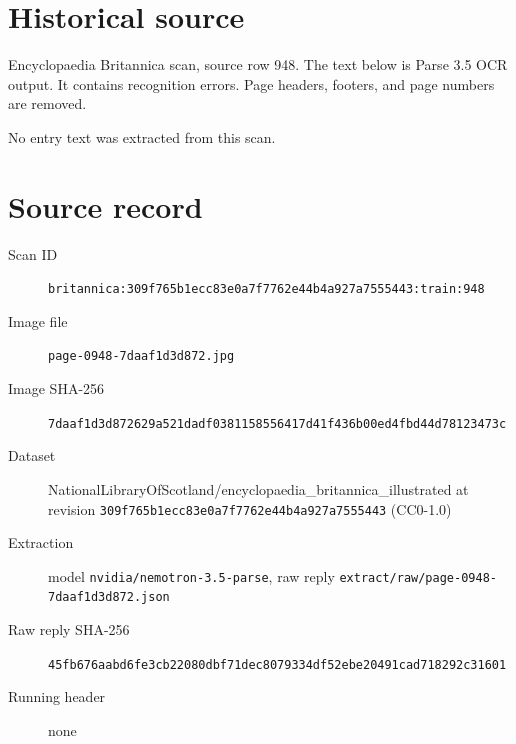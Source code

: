 \documentclass{article}
\begin{document}
\section*{Historical source}
Encyclopaedia Britannica scan, source row 948. The text below is Parse 3.5 OCR output. It contains recognition errors.
Page headers, footers, and page numbers are removed.

No entry text was extracted from this scan.

\section*{Source record}
\begin{description}
\item[Scan ID] \texttt{britannica:309f765b1ecc83e0a7f7762e44b4a927a7555443:train:948}
\item[Image file] \texttt{page-0948-7daaf1d3d872.jpg}
\item[Image SHA-256] \texttt{7daaf1d3d872629a521dadf0381158556417d41f436b00ed4fbd44d78123473c}
\item[Dataset] NationalLibraryOfScotland/encyclopaedia\_britannica\_illustrated at revision \texttt{309f765b1ecc83e0a7f7762e44b4a927a7555443} (CC0-1.0)
\item[Extraction] model \texttt{nvidia/nemotron-3.5-parse}, raw reply \texttt{extract/raw/page-0948-7daaf1d3d872.json}
\item[Raw reply SHA-256] \texttt{45fb676aabd6fe3cb22080dbf71dec8079334df52ebe20491cad718292c31601}

\item[Running header] none
\end{description}
\end{document}
